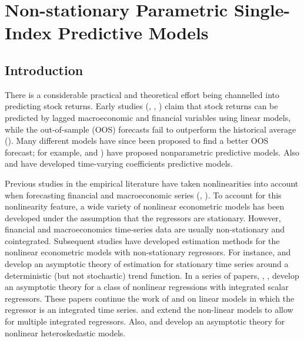 \documentclass[a4paper,12pt,times,numbered,print,index]{report}
\numberwithin{equation}{section}
\begin{document}
	
	\setcounter{chapter}{1}
	\chapter{Non-stationary Parametric Single-Index Predictive Models}
	
	
	\section{Introduction}
	There is a considerable practical and theoretical effort being channelled into predicting stock returns. Early studies (\cite{campbell1988dividend}, \cite{fama1990stock}, \cite{pesaran1995predictability}) claim that stock returns can be predicted by lagged macroeconomic and financial variables using linear models, while the out-of-sample (OOS) forecasts fail to outperform the historical average (\cite{welch2008comprehensive}). Many different models have since been proposed to find a better OOS forecast; for example, \cite{lee2015forecasting} and \cite{chen2016predictability}) have proposed nonparametric predictive models. Also \cite{dangl2012predictive} and \cite{johannes2014sequential} have developed time-varying coefficients predictive models. 
	
	
	
	Previous studies in the empirical literature have taken nonlinearities into account when forecasting financial and macroeconomic series (\cite{lettau2008reconciling}, \cite{qi1999nonlinear}). To account for this nonlinearity feature, a wide variety of nonlinear econometric models has been developed under the assumption that the regressors are stationary. However, financial and macroeconomics time-series data are usually non-stationary and cointegrated. Subsequent studies have developed estimation methods for the nonlinear econometric models with non-stationary regressors. For instance,  \cite{wooldridge1994estimation} and \cite{andrews1995nonlinear} develop an asymptotic theory of estimation for stationary time series around a deterministic (but not stochastic) trend function. In a series of papers, \cite{park1999asymptotics},  \cite{park2000nonstationary}, \cite{park2001nonlinear} develop an asymptotic theory for a class of nonlinear regressions with integrated scalar regressors. These papers continue the work of \cite{park1988statistical} and  \cite{park1989statistical} on linear models in which the regressor is an integrated time series. \cite{chang2001nonlinear} and \cite{chang2003index} extend the non-linear models to allow for multiple integrated regressors. Also, \cite{park2002nonstationary} and \cite{chung2007nonstationary} develop an asymptotic theory for nonlinear heteroskedastic models.
	
\end{document}

